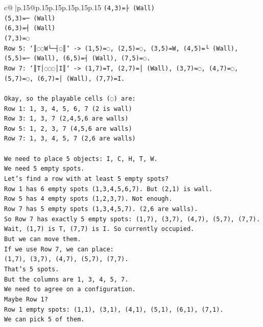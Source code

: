 \documentclass{article}
\begin{document}
{\begin{supertabular}{c@{$\;$}|p{.15\linewidth}@{}p{.15\linewidth}p{.15\linewidth}p{.15\linewidth}p{.15\linewidth}p{.15\linewidth}}
{{{\texttt{(4,3)=├ (Wall)} \\
\texttt{(5,3)=─ (Wall)} \\
\texttt{(6,3)=┤ (Wall)} \\
\texttt{(7,3)=◌} \\
\texttt{Row 5: `║◌◌W└─┤◌║` {-}> (1,5)=◌, (2,5)=◌, (3,5)=W, (4,5)=└ (Wall), (5,5)=─ (Wall), (6,5)=┤ (Wall), (7,5)=◌.} \\
\texttt{Row 7: `║T│◌◌◌│I║` {-}> (1,7)=T, (2,7)=│ (Wall), (3,7)=◌, (4,7)=◌, (5,7)=◌, (6,7)=│ (Wall), (7,7)=I.} \\
\\ 
\texttt{Okay, so the playable cells (◌) are:} \\
\texttt{Row 1: 1, 3, 4, 5, 6, 7 (2 is wall)} \\
\texttt{Row 3: 1, 3, 7 (2,4,5,6 are walls)} \\
\texttt{Row 5: 1, 2, 3, 7 (4,5,6 are walls)} \\
\texttt{Row 7: 1, 3, 4, 5, 7 (2,6 are walls)} \\
\\ 
\texttt{We need to place 5 objects: I, C, H, T, W.} \\
\texttt{We need 5 empty spots.} \\
\texttt{Let's find a row with at least 5 empty spots?} \\
\texttt{Row 1 has 6 empty spots (1,3,4,5,6,7). But (2,1) is wall.} \\
\texttt{Row 5 has 4 empty spots (1,2,3,7). Not enough.} \\
\texttt{Row 7 has 5 empty spots (1,3,4,5,7). (2,6 are walls).} \\
\texttt{So Row 7 has exactly 5 empty spots: (1,7), (3,7), (4,7), (5,7), (7,7).} \\
\texttt{Wait, (1,7) is T, (7,7) is I. So currently occupied.} \\
\texttt{But we can move them.} \\
\texttt{If we use Row 7, we can place:} \\
\texttt{(1,7), (3,7), (4,7), (5,7), (7,7).} \\
\texttt{That's 5 spots.} \\
\texttt{But the columns are 1, 3, 4, 5, 7.} \\
\texttt{We need to agree on a configuration.} \\
\texttt{Maybe Row 1?} \\
\texttt{Row 1 empty spots: (1,1), (3,1), (4,1), (5,1), (6,1), (7,1).} \\
\texttt{We can pick 5 of them.} \\
}}}
\end{supertabular}}
\end{document}
